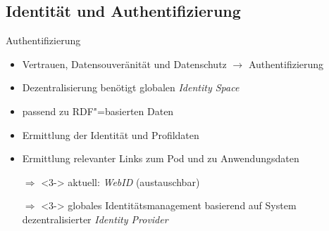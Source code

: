 \subsection{Identität und Authentifizierung}

\begin{frame}{Authentifizierung \footnotesize\cite{sambraSolidPlatformDecentralized2016}}
    \begin{itemize}
        \item Vertrauen, Datensouveränität und Datenschutz $\to$ Authentifizierung
        \item Dezentralisierung benötigt globalen \emph{Identity Space}
        
        \item<2-> passend zu RDF"=basierten Daten
        \item<2-> Ermittlung der Identität und Profildaten
        \item<2-> Ermittlung relevanter Links zum Pod und zu Anwendungsdaten
        
        \item[$\Rightarrow$]<3-> aktuell: \emph{WebID} (austauschbar)
        \item[$\Rightarrow$]<3-> globales Identitätsmanagement basierend auf System dezentralisierter \emph{Identity Provider}
    \end{itemize}
\end{frame}



